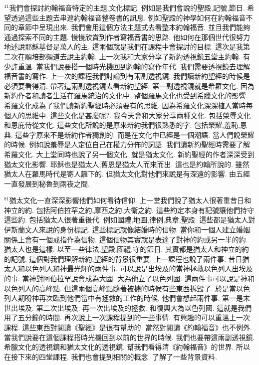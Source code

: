 \documentclass{book}
\begin{document}
$^{41}$我們會探討約翰福音特定的主題,文化標記.
例如是我們會說的聖殿,記號,節日.
希望透過這些主題去串連約翰福音整卷書的訊息.
例如聖殿的神學如何在約翰福音不同的章節中呈現出來.
我們會用這個方法主題式去看整本約翰福音.
並且我們能夠通過探索不同的主題.
慢慢欣賞到作者寫福音書的思路.
他如何在那個世代很努力地述說耶穌基督是萬人的主.
這兩個就是我們在課程中會探討的目標.
這次是我第二次在順培部頻道去說主約翰.
上一次我和大家分享了新約透視鏡五堂主約翰.
有少許重溫.
當我們說要搭一個時光機回到約翰的寫作年代.
我們需要透視鏡去理解福音書的寫作.
上一次的課程我們討論到有兩副透視鏡.
我們讀新約聖經的時候是必須要看得清.
帶著這兩副透視鏡去看新約聖經.
第一副透視鏡就是希羅文化.
因為新約作者和讀者生活在羅馬統治的文化中.
整個羅馬文化也受到希臘文化的影響.
希羅文化成為了我們讀新約聖經時必須要有的思維.
因為希羅文化深深植入當時每個人的思維中.
這些文化是甚麼呢?.
我今天會和大家分享兩種文化.
包括榮辱文化和恩庇侍從文化.
這些文化所說的是原來新約我們很熟悉的字.
包括榮耀,羞恥,恩典.
這些字原來不是新約作者獨創的.
而是在文化中已經是一個潮語.
當人們說榮耀的時候.
例如說羞辱是人定位自己在權力分佈的詞語.
我們讀新約聖經時需要了解希羅文化.
大上堂同時也說了另一個文化.
就是猶太文化.
新約聖經的作者深深受到猶太文化影響.
耶穌也是猶太人,舊恩是猶太人而來而出.
這也是約翰所說的.
雖然猶太人在羅馬時代是寄人籬下的.
但猶太文化對他們來說是有深遠的影響.
由五經一直發展到秘魯到兩夜之間.

$^{81}$猶太文化一直深深影響他們如何看待信仰.
上一堂我們說了猶太人很著重昔日和神立的約.
包括阿伯拉罕之約,摩西之約,大衛之約.
這些約定本身有記號讓他們持守這些約.
包括猶太人很著重後代.
例如國禮,地圖,律例,典章,聖殿.
這些都是猶太人對伊斯蘭文人來說的身份標記.
這些標記就像結婚時的信物.
當你和一個人建立婚姻.
關係上會有一個戒指作為信物.
這個信物其實就是表達了對神的約或另一半的約.
猶太人也是這樣.
以至一些律法,聖殿,國禮,守的節日.
其實都是猶太人和神立的約的記號.
這個對我們理解新約,聖經的背景很重要.
上一課程也說了兩件事.
昔日猶太人和以色列人和神最光輝的兩件事.
可以說是出埃及的當神拯救以色列人出埃及的事.
當神對阿伯拉罕說會成為大國.
大為他立了以色列國.
這兩件事可以說是神和以色列人的高峰點.
但這兩個高峰點隨著被擄的時候有些東西拆毀了.
於是當以色列人期盼神再次臨到他們當中有拯救的工作的時候.
他們會想起兩件事.
第一是末世出埃及.
第二次出埃及.
再一次出埃及的拯救.
和復興大為以色列國.
這就是我們用了五分鐘的時間.
再次說上一次課程提到的一些事情.
有興趣的可以重溫上一次課程.
這些東西對閱讀《聖經》是很有幫助的.
當然對閱讀《約翰福音》也不例外.
當我們說要在這個課程搭時光機回到以前的世界的時候.
我們也要帶這兩副透視鏡.
希臘文化的透視鏡和猶太文化的透視鏡.
幫我們看得清《約翰福音》的世界.
所以在接下來的四堂課程.
我們也會提到相關的概念.
了解了一些背景資料.
\end{document}
